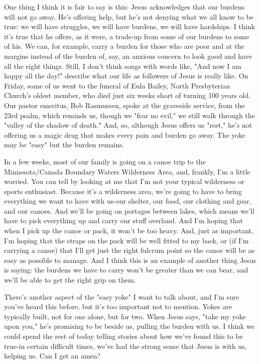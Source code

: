 \documentclass[11pt]{article}
\begin{document}
One thing I think it is fair to say is this: Jesus acknowledges
that our burdens will not go away. He's offering help, but he's
not denying what we all know to be true: we will have struggles,
we will have burdens, we will have hardships. I think it's true
that he offers, as it were, a trade-up from some of our burdens to
some of his. We can, for example, carry a burden for those who are
poor and at the margins instead of the burden of, say, an anxious
concern to look good and have all the right things. Still, I don't
think songs with words like, "And now I am happy all the day!"
describe what our life as followers of Jesus is really like. On
Friday, some of us went to the funeral of Eula Bailey, North
Presbyterian Church's oldest member, who died just six weeks short
of turning 100 years old. Our pastor emeritus, Bob Rasmussen,
spoke at the graveside service, from the 23rd psalm, which reminds
us, though we "fear no evil," we still walk through the "valley of
the shadow of death." And, so, although Jesus offers us "rest,"
he's not offering us a magic drug that makes every pain and burden
go away. The yoke may be "easy" but the burden remains.

In a few weeks, most of our family is going on a canoe trip to the
Minnesota/Canada Boundary Waters Wilderness Area, and, frankly,
I'm a little worried. You can tell by looking at me that I'm not
your typical wilderness or sports enthusiast. Because it's a
wilderness area, we're going to have to bring everything we want
to have with us-our shelter, our food, our clothing and gear, and
our canoes. And we'll be going on portages between lakes, which
means we'll have to pick everything up and carry our stuff
overland. And I'm hoping that when I pick up the canoe or pack, it
won't be too heavy. And, just as important, I'm hoping that the
straps on the pack will be well fitted to my back, or (if I'm
carrying a canoe) that I'll get just the right fulcrum point so
the canoe will be as easy as possible to manage. And I think this
is an example of another thing Jesus is saying: the burdens we
have to carry won't be greater than we can bear, and we'll be able
to get the right grip on them.

There's another aspect of the "easy yoke" I want to talk about,
and I'm sure you've heard this before, but it's too important not
to mention. Yokes are typically built, not for one alone, but for
two. When Jesus says, "take my yoke upon you," he's promising to
be beside us, pulling the burden with us. I think we could spend
the rest of today telling stories about how we've found this to be
true-in certain difficult times, we've had the strong sense that
Jesus is with us, helping us. Can I get an amen?
\end{document}
